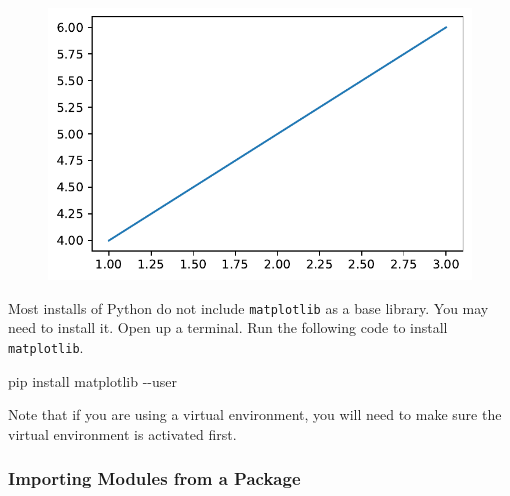 \documentclass[
  letterpaper,
  DIV=11,
  numbers=noendperiod]{scrreprt}
\newenvironment{Shaded}{\begin{snugshade}}{\end{snugshade}}
\newcommand{\AttributeTok}[1]{\textcolor[rgb]{0.40,0.45,0.13}{#1}}
\newcommand{\ExtensionTok}[1]{\textcolor[rgb]{0.00,0.23,0.31}{#1}}
\newcommand{\NormalTok}[1]{\textcolor[rgb]{0.00,0.23,0.31}{#1}}
\begin{document}
\begin{figure}[H]

{\centering \includegraphics{09_Libraries_files/figure-pdf/cell-8-output-1.pdf}

}

\end{figure}

\begin{tcolorbox}[enhanced jigsaw, coltitle=black, colback=white, bottomrule=.15mm, arc=.35mm, titlerule=0mm, opacitybacktitle=0.6, toptitle=1mm, left=2mm, toprule=.15mm, opacityback=0, bottomtitle=1mm, title=\textcolor{quarto-callout-note-color}{\faInfo}\hspace{0.5em}{Installing \texttt{matplotlib}}, rightrule=.15mm, colframe=quarto-callout-note-color-frame, breakable, colbacktitle=quarto-callout-note-color!10!white, leftrule=.75mm]

Most installs of Python do not include \texttt{matplotlib} as a base
library. You may need to install it. Open up a terminal. Run the
following code to install \texttt{matplotlib}.

\begin{Shaded}
\begin{Highlighting}[]
\ExtensionTok{pip}\NormalTok{ install matplotlib }\AttributeTok{{-}{-}user}
\end{Highlighting}
\end{Shaded}

Note that if you are using a virtual environment, you will need to make
sure the virtual environment is activated first.

\end{tcolorbox}

\hypertarget{importing-modules-from-a-package}{%
\subsubsection{Importing Modules from a
Package}\label{importing-modules-from-a-package}}
\end{document}
